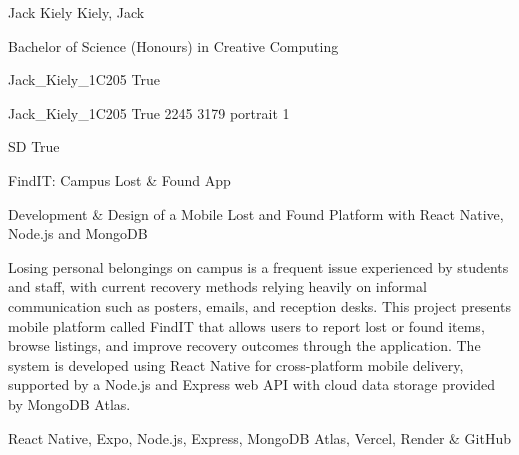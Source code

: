 
\begingroup{}\relax



\def\Key{Jack_Kiely_1C205}

{Jack Kiely}
{Kiely, Jack}

{Bachelor of Science (Honours) in Creative Computing}

{Jack_Kiely_1C205}
{True}

{Jack_Kiely_1C205}
{True}
{2245}
{3179}
{portrait}
{1}

{SD}
{True}

{FindIT: Campus Lost \& Found App}

{Development \& Design of a Mobile Lost and Found Platform with React Native, Node.js and MongoDB}

{Losing personal belongings on campus is a frequent issue experienced by students and staff, with current recovery methods relying heavily on informal communication such as posters, emails, and reception desks. This project presents mobile platform called FindIT that allows users to report lost or found items, browse listings, and improve recovery outcomes through the application. The system is developed using {React Native} for cross-platform mobile delivery, supported by a {Node.js} and {Express} web {API} with cloud data storage provided by {MongoDB Atlas}.}

{React Native, Expo, Node.js, Express, MongoDB Atlas, Vercel, Render \& GitHub}

